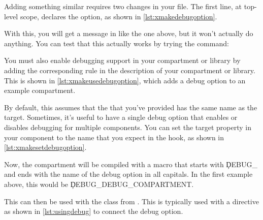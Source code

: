Adding something similar requires two changes in your  file.
The first line, at top-level scope, declares the option, as shown in \ref{lst:xmakedebugoption}.

\lualisting[filename=examples/debug_helpers/xmake.lua,marker=debug_option,label=lst:xmakedebugoption,caption="Build system code for defining a debug option."]{}

With this, you will get a message in    like the one above, but it won't actually do anything.
You can test that this actually works by trying the command:


You must also enable debugging support in your compartment or library by adding the corresponding rule in the description of your compartment or library.
This is shown in \ref{lst:xmakeusedebugoption}, which adds a debug option to an example compartment.

\lualisting[filename=examples/debug_helpers/xmake.lua,marker=use_debug,label=lst:xmakeusedebugoption,caption="Build system code for using a debug option."]{}

By default, this assumes that the  that you've provided has the same name as the target.
Sometimes, it's useful to have a single debug option that enables or disables debugging for multiple components.
You can set the  target property in your component to the name that you expect in the  hook, as shown in \ref{lst:xmakesetdebugoption}.

\lualisting[filename=examples/debug_helpers/xmake.lua,marker=set_debug_option,label=lst:xmakesetdebugoption,caption="Build system code for providing the debug option name explicitly."]{}

Now, the compartment will be compiled with a macro that starts with \c{DEBUG_} and ends with the name of the debug option in all capitals.
In the first example above, this would be \c{DEBUG_DEBUG_COMPARTMENT}.

This can then be used with the  class from .
This is typically used with a  directive as shown in \ref{lst:usingdebug} to connect the debug option.


